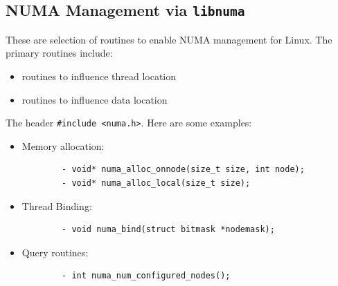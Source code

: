 \documentclass[12pt, a4paper]{report}
\begin{document}
\subsection{NUMA Management via \texttt{libnuma}}
These are selection of routines to enable NUMA management for Linux. The primary routines include:
\begin{itemize}
    \item routines to influence thread location
    \item routines to influence data location
\end{itemize}
The header \verb$#include <numa.h>$. Here are some examples:
\begin{itemize}
    \item Memory allocation:
    \begin{verbatim}
        - void* numa_alloc_onnode(size_t size, int node);
        - void* numa_alloc_local(size_t size);
    \end{verbatim}
    \item Thread Binding:
    \begin{verbatim}
        - void numa_bind(struct bitmask *nodemask);
    \end{verbatim}
    \item Query routines:
    \begin{verbatim}
        - int numa_num_configured_nodes();
    \end{verbatim}
\end{itemize}
\end{document}
